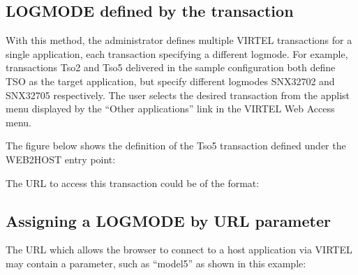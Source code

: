 \documentclass[letterpaper,10pt,english]{sphinxmanual}
\begin{document}
\ignorespaces 

\subsection{LOGMODE defined by the transaction}
\label{\detokenize{Customization:logmode-defined-by-the-transaction}}\label{\detokenize{Customization:index-61}}
\sphinxAtStartPar
With this method, the administrator defines multiple VIRTEL transactions for a single application, each transaction specifying a different logmode. For example, transactions Tso2 and Tso5 delivered in the sample configuration both define TSO as the target application, but specify different logmodes SNX32702 and SNX32705 respectively. The user selects the desired transaction from the applist menu displayed by the “Other applications” link in the VIRTEL Web Access menu.

\sphinxAtStartPar
The figure below shows the definition of the Tso5 transaction defined under the WEB2HOST entry point:

\sphinxAtStartPar
{}

\sphinxAtStartPar
{}

\sphinxAtStartPar
The URL to access this transaction could be of the format:

\begin{sphinxVerbatim}[commandchars=\\\{\}]
\end{sphinxVerbatim}

\ignorespaces 

\subsection{Assigning a LOGMODE by URL parameter}
\label{\detokenize{Customization:assigning-a-logmode-by-url-parameter}}\label{\detokenize{Customization:index-62}}
\sphinxAtStartPar
The URL which allows the browser to connect to a host application via VIRTEL may contain a parameter, such as “model5” as shown in this example:
\end{document}
